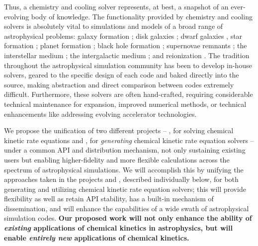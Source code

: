 Thus, a chemistry and cooling solver
represents, at best, a snapshot of an ever-evolving body of
knowledge.  The functionality provided by chemistry and cooling solvers is
absolutely vital to simulations and models of a broad range of
astrophysical problems: galaxy formation \citep{2016ApJ...830L..13M,
2016MNRAS.462.3265D, 2017MNRAS.465.2540P, 2017MNRAS.466..105A,
2017MNRAS.tmp..110D}; disk galaxies \citep{2015MNRAS.449.2588P,
2015ApJ...814..131G}; dwarf galaxies \citep{2017arXiv170108779H}, 
star formation \citep{2013RvMP...85.1021T, 2016Natur.535..523F,
2017ApJ...835..137W};
planet formation \citep{2013RvMP...85.1021T, 2017A&A...605A..16F,
2018arXiv180310526A};
black hole formation \citep{2016MNRAS.459.3217L, 2016MNRAS.459.4209A,
2016MNRAS.459.3377R, 2016MNRAS.461..111R}; supernovae remnants
\citep{2012ApJ...748...12S, 2016arXiv161008528B, 2017MNRAS.465.2471G};
the interstellar medium \citep{2015ApJ...814....4L,
2016arXiv161201786K}; the intergalactic medium
\citep{2011ApJ...731....6S, 2011MNRAS.413..190T, 2012MNRAS.420..829O};
and reionization \citep{2014ApJ...789L..32K, 2015ApJ...811....3S}.
The tradition throughout the astrophysical simulation community has
been to develop in-house solvers, geared to the specific design of
each code and baked directly into the source, making abstraction and
direct comparison between codes extremely difficult.  Furthermore,
these solvers are often hand-crafted, requiring considerable technical
maintenance for expansion, improved numerical methods, or technical
enhancements like addressing evolving accelerator technologies.

We propose the unification of two different projects -- \grackle{}, for solving
chemical kinetic rate equations and \dengo{}, for \textit{generating} chemical
kinetic rate equation solvers -- under a common API and distribution mechanism,
not only sustaining existing users but enabling higher-fidelity and more
flexible calculations across the spectrum of astrophysical simulations.  We
will accomplish this by unifying the approaches taken in the projects
\grackle{} and \dengo{}, described individually below, for both generating and
utilizing chemical kinetic rate equation solvers; this will provide flexibility
as well as retain API stability, has a built-in mechanism of dissemination, and
will enhance the capabilities of a wide swath of astrophysical simulation
codes.  \textbf{Our proposed work will not only enhance the ability of
\textit{existing} applications of chemical kinetics in astrophysics, but will
enable \textit{entirely new} applications of chemical kinetics.}  
